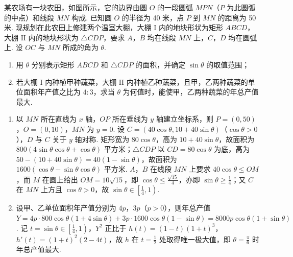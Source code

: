 \begin{problem}
某农场有一块农田，如图所示，它的边界由圆 \(O\) 的一段圆弧 \(MPN\)（\(P\) 为此圆弧的中点）和线段 \(MN\) 构成. 已知圆 \(O\) 的半径为 40 米，点 \(P\) 到 \(MN\) 的距离为 50 米. 现规划在此农田上修建两个温室大棚，大棚 \(\mathrm{I}\) 内的地块形状为矩形 \(ABCD\)，大棚 \(\mathrm{II}\) 内的地块形状为 \(\triangle CDP\)，要求 \(A\)，\(B\) 均在线段 \(MN\) 上，\(C\)，\(D\) 均在圆弧上. 设 \(OC\) 与 \(MN\) 所成的角为 \(\theta\).

\begin{enumerate}
\item 用 \(\theta\) 分别表示矩形 \(ABCD\) 和 \(\triangle CDP\) 的面积，并确定 \(\sin\theta\) 的取值范围；
\item 若大棚 \(\mathrm{I}\) 内种植甲种蔬菜，大棚 \(\mathrm{II}\) 内种植乙种蔬菜，且甲，乙两种蔬菜的单位面积年产值之比为 \(4:3\)，求当 \(\theta\) 为何值时，能使甲，乙两种蔬菜的年总产值最大.
\end{enumerate}

\begin{center}
\end{center}
\end{problem}

\begin{solution}
\begin{enumerate}
\item 以 \(MN\) 所在直线为 \(x\) 轴，\(OP\) 所在垂线为 \(y\) 轴建立坐标系，则 \(P=(0,50)\)，\(O=(0,10)\)，\(MN\) 为 \(y=0\). 设 \(C=(40\cos\theta,10+40\sin\theta)\)（\(\cos\theta>0\)），\(D\) 与 \(C\) 关于 \(y\) 轴对称. 矩形宽为 \(80\cos\theta\)，高为 \(10+40\sin\theta\)，故面积为 \(800\left(4\sin\theta\cos\theta+\cos\theta\right)\text{ 平方米}\)；\(\triangle CDP\) 以 \(CD=80\cos\theta\) 为底，高为 \(50-(10+40\sin\theta)=40(1-\sin\theta)\)，故面积为 \(1600\left(\cos\theta-\sin\theta\cos\theta\right)\text{ 平方米}\). \(A\)，\(B\) 在线段 \(MN\) 上要求 \(40\cos\theta\leqslant OM\)，而 \(M\) 在圆上给出 \(OM=10\sqrt{15}\)，即 \(\cos\theta\leqslant\frac{\sqrt{15}}{4}\)，亦即 \(\sin\theta\geqslant\frac14\)；又 \(C\) 在 \(MN\) 上方且 \(\cos\theta>0\)，故 \(\sin\theta\in\left[\frac14,1\right)\).
\item 设甲、乙单位面积年产值分别为 \(4p\)，\(3p\)（\(p>0\)），则年总产值 \(Y=4p\cdot800\cos\theta(1+4\sin\theta)+3p\cdot1600\cos\theta(1-\sin\theta)=8000p\cos\theta(1+\sin\theta)\). 记 \(t=\sin\theta\in\left[\frac14,1\right)\)，\(Y^2\) 正比于 \(h(t)=(1-t)(1+t)^3\)，\(h'(t)=(1+t)^2(2-4t)\)，故 \(h\) 在 \(t=\frac12\) 处取得唯一极大值，即 \(\theta=\frac\pi6\) 时年总产值最大.
\end{enumerate}
\end{solution}

